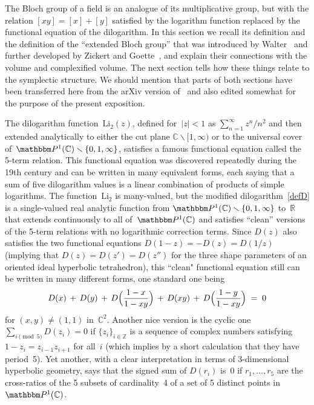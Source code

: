 \documentclass[12pt,reqno]{amsart}
\theoremstyle{definition}
\def\BP{\mathbbm P}
\def\={\;=\;}
\def\+{\,+\,}
\def\sm{\smallsetminus}
\def\Li{\mathrm{Li}}
\def\R{\mathbb R}
\def\C{\mathbb C}
\def\Z{\mathbb Z}
\def\ssm{\sm}
\begin{document}
The Bloch group of a field is an analogue of its multiplicative group, but with the 
relation $[xy]=[x]+[y]$ satisfied by the logarithm function replaced by the functional 
equation of the dilogarithm.  In this section we recall its definition and the definition 
of the ``extended Bloch group'' that was introduced by Walter~\cite{N:extended} and further 
developed by Zickert and Goette~\cite{Goette,Zickert:extended}, and explain their connections 
with the volume and complexified volume.  The next section tells how these things relate
to the symplectic structure.  We should mention that parts of both sections have been 
transferred here from the arXiv version of~\cite{GZ:kashaev} and also edited somewhat for 
the purpose of the present exposition.

The dilogarithm function~$\Li_2(z)$, defined for~$|z|<1$ as $\sum_{n=1}^\infty z^n/n^2$
and then extended analytically to either the cut plane $\C\ssm[1,\infty)$ or to the universal
cover of~$\BP^1(\C)\ssm\{0,1,\infty\}$, satisfies a famous functional equation called the
5-term relation. This functional equation was discovered repeatedly during the 19th century 
and can be written in many equivalent forms, each saying that a sum of five dilogarithm 
values is a linear combination of products of simple logarithms.  
The function~$\Li_2$ is many-valued, but the modified dilogarithm~\eqref{defD} is a 
single-valued real analytic function from $\BP^1(\C)\ssm\{0,1,\infty\}$ to~$\R$ that 
extends continuously to all of~$\BP^1(\C)$ and satisfies ``clean'' versions of the 5-term 
relations with no logarithmic correction terms.  Since $D(z)$ also satisfies the two 
functional equations $D(1-z)=-D(z)=D(1/z)$ (implying that $D(z)=D(z')=D(z'')$ for the 
three shape parameters of an oriented ideal hyperbolic tetrahedron), this ``clean" 
functional equation still can be written in many different forms, one standard one being
$$ 
D(x) \+ D(y) \+ D\Bigl(\frac{1-x}{1-xy}\Bigr) \+ D(xy) \+ D\Bigl(\frac{1-y}{1-xy}\Bigr) \= 0  
$$
for $(x,y)\ne(1,1)$ in~$\C^2$.  Another nice version is the cyclic one 
$\sum_{i\!\pmod5} D(z_i)=0$ if $\{z_i\}_{i\in\Z}$ is a sequence of complex numbers 
satisfying $1-z_i=z_{i-1}z_{i+1}$ for all~$i$ (which implies by a short calculation that 
they have period~5). Yet another, with a clear interpretation in terms of 3-dimensional 
hyperbolic geometry, says that the signed sum of $D(r_i)$ is~0 if $r_1,\dots,r_5$
are the cross-ratios of the 5 subsets of cardinality~4 of a set of 5 distinct points
in~$\BP^1(\C)$. 
\end{document}
